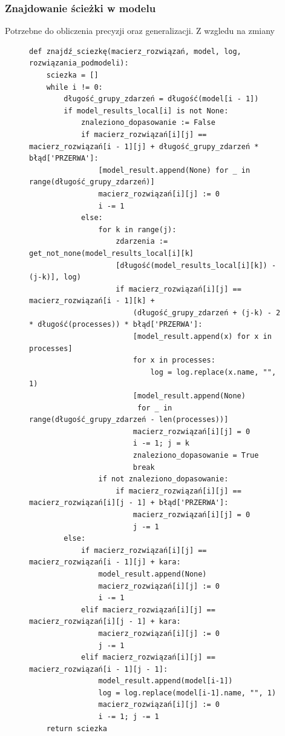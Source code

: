 \subsubsection{Znajdowanie ścieżki w modelu}
Potrzebne do obliczenia precyzji oraz generalizacji. Z wzgledu na zmiany
\begin{figure}[!ht]
\lstset{caption=Znajdowanie ścieżki w modelu, captionpos=b}
\lstset{label=src:traceback, frame=single}
\begin{lstlisting}
def znajdź_sciezkę(macierz_rozwiązań, model, log, rozwiązania_podmodeli):
    sciezka = []
    while i != 0:
        długość_grupy_zdarzeń = długość(model[i - 1])
        if model_results_local[i] is not None:
            znaleziono_dopasowanie := False
            if macierz_rozwiązań[i][j] == macierz_rozwiązań[i - 1][j] + długość_grupy_zdarzeń * błąd['PRZERWA']:
                [model_result.append(None) for _ in range(długość_grupy_zdarzeń)]
                macierz_rozwiązań[i][j] := 0
                i -= 1
            else:
                for k in range(j):
                    zdarzenia := get_not_none(model_results_local[i][k]
                    [długość(model_results_local[i][k]) - (j-k)], log)
                    if macierz_rozwiązań[i][j] == macierz_rozwiązań[i - 1][k] + 
                    	(długość_grupy_zdarzeń + (j-k) - 2 * długość(processes)) * błąd['PRZERWA']:
                        [model_result.append(x) for x in processes]
                        for x in processes:
                            log = log.replace(x.name, "", 1)
                        [model_result.append(None) 
                         for _ in range(długość_grupy_zdarzeń - len(processes))]
                        macierz_rozwiązań[i][j] = 0
                        i -= 1; j = k
                        znaleziono_dopasowanie = True
                        break
                if not znaleziono_dopasowanie:
                    if macierz_rozwiązań[i][j] == macierz_rozwiązań[i][j - 1] + błąd['PRZERWA']:
                        macierz_rozwiązań[i][j] = 0
                        j -= 1
        else:
            if macierz_rozwiązań[i][j] == macierz_rozwiązań[i - 1][j] + kara:
                model_result.append(None)
                macierz_rozwiązań[i][j] := 0
                i -= 1
            elif macierz_rozwiązań[i][j] == macierz_rozwiązań[i][j - 1] + kara:
                macierz_rozwiązań[i][j] := 0
                j -= 1
            elif macierz_rozwiązań[i][j] == macierz_rozwiązań[i - 1][j - 1]:
                model_result.append(model[i-1])
                log = log.replace(model[i-1].name, "", 1)
                macierz_rozwiązań[i][j] := 0
                i -= 1; j -= 1
    return sciezka
\end{lstlisting}
\end{figure}
\clearpage
